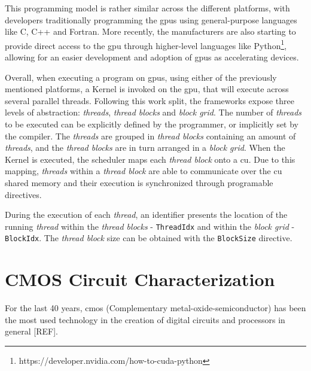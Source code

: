 This programming model is rather similar across the different platforms, with developers traditionally programming the \acrshort{gpu}s using general-purpose languages like C, C++ and Fortran. More recently, the manufacturers are also starting to provide direct access to the \acrshort{gpu} through higher-level languages like Python\footnote{https://developer.nvidia.com/how-to-cuda-python}, allowing for an easier development and adoption of \acrshort{gpu}s as accelerating devices.

Overall, when executing a program on \acrshort{gpu}s, using either of the previously mentioned platforms, a Kernel is invoked on the \acrshort{gpu}, that will execute across several parallel threads. Following this work split, the frameworks expose three levels of abstraction: \textit{threads}, \textit{thread blocks} and  \textit{block grid}. The number of \textit{threads} to be executed can be explicitly defined by the programmer, or implicitly set by the compiler. The \textit{threads} are grouped in \textit{thread blocks} containing an amount of \textit{threads}, and the \textit{thread blocks} are in turn arranged in a \textit{block grid}. When the Kernel is executed, the scheduler maps each \textit{thread block} onto a \acrshort{cu}. Due to this mapping, \textit{threads} within a \textit{thread block} are able to communicate over the \acrshort{cu} shared memory and their execution is synchronized through programable directives.

During the execution of each \textit{thread}, an identifier presents the location of the running \textit{thread} within the \textit{thread blocks} - \texttt{ThreadIdx} and within the \textit{block grid} - \texttt{BlockIdx}. The \textit{thread block} size can be obtained with the \texttt{BlockSize} directive. 

\section{CMOS Circuit Characterization}
\label{section:CMOS}

For the last 40 years, \acrshort{cmos} (Complementary metal-oxide-semiconductor) has been the most used technology in the creation of digital circuits and processors in general [REF]. 

